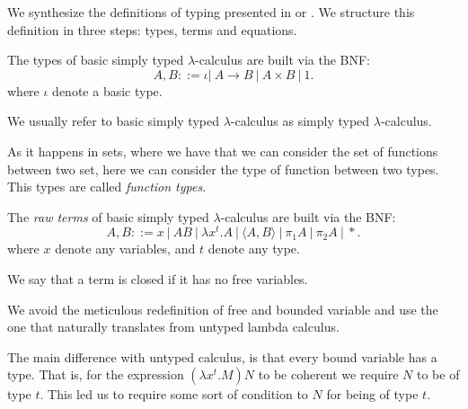 We synthesize the definitions of typing presented in \cite{lambek1988introduction} or \cite{selinger2008lecture}. We structure this definition in three steps: types, terms  and equations.


\begin{definition}
  The types of basic simply typed $\lambda$-calculus are built via the BNF:
  $$A,B ::= \iota |\ A\to B\ |\ A \times B  \ |\ 1.$$
  where $\iota$ denote a basic type. 
\end{definition}
\begin{remark}
  We usually refer to basic simply typed $\lambda$-calculus as simply typed $\lambda$-calculus.
\end{remark}




As it happens in sets, where we have that we can consider the set of functions between two set, here we can consider the type of function between two types. This types are called \emph{function types}.\\




\begin{definition}
  The \emph{raw terms} of basic simply typed $\lambda$-calculus are built via the BNF:
  $$A,B ::= x\ |\ AB\ |\ \lambda x^t.A \ |\ \langle A,B \rangle\ |\ \pi_1A\ |\ \pi_2A\ |\ *.$$
  where $x$ denote any variables, and $t$ denote any type. 
\end{definition}
\begin{definition}
  We say that a term is closed if it has no free variables.
\end{definition}
\begin{remark}
  We avoid the meticulous redefinition of free and bounded variable and use the one that naturally translates from untyped lambda calculus.
\end{remark}


The main difference with untyped calculus, is that every bound variable has a type. That is, for the expression $(\lambda x^t.M)N$ to be coherent we require $N$ to be of type $t$. This led us to require some sort of condition to $N$ for being of type $t$.\\

